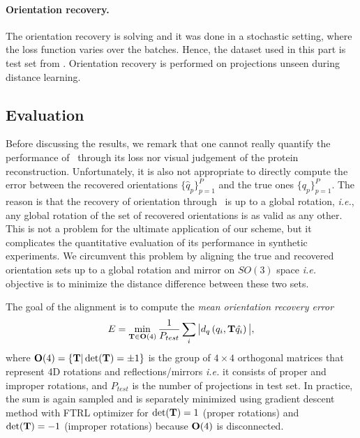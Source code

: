 \paragraph{Orientation recovery.}
The orientation recovery is solving  and it was done in a stochastic setting, where the loss function varies over the batches.
Hence, the dataset used in this part is test set from .
Orientation recovery is performed on projections unseen during distance learning.

\subsection{Evaluation}\label{sec:results:evaluation}



Before discussing the results, we remark that one cannot really quantify the performance of~ through its loss nor visual judgement of the protein reconstruction.
Unfortunately, it is also not appropriate to directly compute the error between the recovered orientations $\big\{\widehat{q}_p\big\}_{p=1}^P$ and the true ones $\big\{q_p\big\}_{p=1}^P$.
The reason is that the recovery of orientation through~ is up to a global rotation, \textit{i.e.}, any global rotation of the set of recovered orientations is as valid as any other.
This is not a problem for the ultimate application of our scheme, but it complicates the quantitative evaluation of its performance in synthetic experiments.
We circumvent this problem by aligning the true and recovered orientation sets up to a global rotation and mirror on $SO(3)$ space \textit{i.e.} objective is to minimize the distance difference between these two sets.


The goal of the alignment is to compute the \textit{mean orientation recovery error}
\begin{equation}
    E = \min_{\mathbf{T} \in \mathrm{\mathbf{O}}(4)} \frac{1}{P_{test}} \sum_{i} \big| d_q\left( q_i, \mathbf{T} \hat{q_i} \right) \big|,
    \label{eqn:orientation-recovery-error}
\end{equation}
where $\mathrm{\mathbf{O}}(4) = \{\mathbf{T} | \det(\mathbf{T}) = \pm 1\}$ is the group of $4 \times 4$ orthogonal matrices that represent 4D rotations and reflections/mirrors \textit{i.e.} it consists of proper and improper rotations, and $P_{test}$ is the number of projections in test set.
In practice, the sum is again sampled and  is separately minimized using gradient descent method with FTRL optimizer \cite{mcmahan_ad_2013,noauthor_tfkerasoptimizersftrl_nodate} for $\det(\mathbf{T}) = 1$ (proper rotations) and $\det(\mathbf{T}) = -1$ (improper rotations) because $\mathrm{\mathbf{O}}(4)$ is disconnected.


